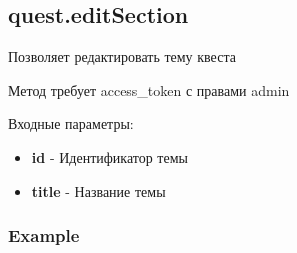 \subsection{quest.editSection}

Позволяет редактировать тему квеста

Метод требует access\_token с правами admin

Входные параметры:
\begin{itemize}
  \item \textbf{id} - Идентификатор темы
  \item \textbf{title} - Название темы
\end{itemize}

\subsubsection{Example}
\begin{Verbatim}[frame=single]

\end{Verbatim}